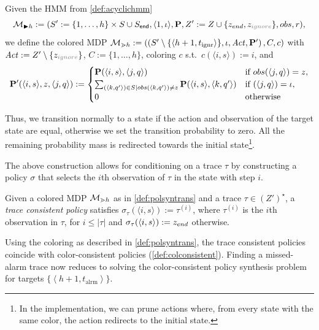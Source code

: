 \documentclass[runningheads]{llncs}
\newcommand{\Obs}{Z}
\newcommand{\talrm}{t_{\text{alrm}}}
\newcommand{\tig}{t_{\text{ignr}}}
\newcommand{\ig}{z_{\color{gray} ignore}\xspace}
\newcommand{\en}{z_{\color{black} end}\xspace}
\newcommand{\alarms}[1][h+1]{\left\langle #1, \talrm\right\rangle}
\newcommand{\igs}[1][h+1]{\left\langle #1, \tig\right\rangle}
\newcommand{\defeq}{:=}
\begin{document}
\begin{definition}\label{def:polsyntrans}
    Given the HMM from \cref{def:acyclichmm} \[ \mc_{\blacktriangleright h} \defeq (\Sts' \defeq \{1,\hdots,h\} \times \Sts \cup \Sts_{\mathsf{end}}, \langle 1,\init\rangle, \ptrans, \Obs' \defeq \Obs \cup \{\en, \ig\}, \obsf, r),\] we define the colored MDP $\mdp_{\gtrdot h} \defeq \left(\left(\Sts'\setminus\{\igs\}, \init, \Act, \ptrans' \right), C, c\right)$ with $\Act \defeq \Obs'\setminus\{\ig\}$, $C \defeq \{1,\ldots,h\}$, coloring $c$ s.t.\  $c(\langle i,s \rangle) \defeq i$, and
    \begin{align*}
        \ptrans'(\langle i, s\rangle, z, \langle j, q\rangle) \defeq
        \begin{cases}
            \ptrans(\langle i, s\rangle, \langle j, q\rangle)                                                                             & \text{if } \obsf(\langle j, q\rangle) = z, \\
            \sum_{(\langle k, q'\rangle)\in S \mid \obsf(\langle k, q'\rangle) \neq z} \ptrans(\langle i, s\rangle, \langle k, q'\rangle) & \text{if } (\langle j, q\rangle) = \iota , \\
            0                                                                                                                             & \text{otherwise}
        \end{cases}
    \end{align*}
\end{definition}
Thus, we transition normally to a state if the action and observation of the target state are equal, otherwise we set the transition probability to zero. All the remaining probability mass is redirected towards the initial state\footnote{In the implementation, we can prune actions where, from every state with the same color, the action redirects to the initial state.}.

The above construction allows for conditioning on a trace $\tau$ by constructing a policy $\sigma$ that selects the $i$th observation of $\tau$ in the state with step $i$.
\begin{definition}
    Given a colored MDP $\mathcal{M}_{\gtrdot h}$ as in \cref{def:polsyntrans} and a trace $\tau \in (Z')^\star$, a \emph{trace consistent policy} satisfies $\sigma_\tau(\langle i, s \rangle) \defeq \tau^{(i)}$, where $\tau^{(i)}$ is the $i$th observation in $\tau$, for $i \leq |\tau|$ and $\sigma_\tau(\langle i, s \rangle) \defeq \en$ otherwise.
\end{definition}
Using the coloring as described in \cref{def:polsyntrans}, the trace consistent policies coincide with color-consistent policies (\cref{def:colconsistent}). Finding a missed-alarm trace now reduces to solving the color-consistent policy synthesis problem for targets $\{ \alarms \}$.
\end{document}
